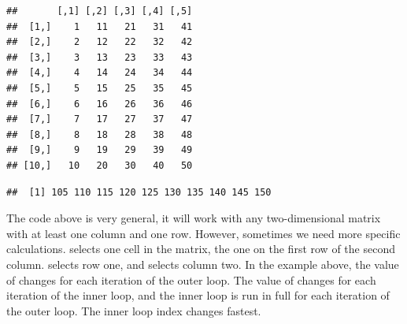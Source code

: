 \documentclass[krantz2]{krantz}\usepackage{knitr}
\begin{document}
\begin{knitrout}\footnotesize
{}\color{fgcolor}\begin{kframe}
\begin{alltt}
 \hlkwb{<-} \hlstd{(}\hlopt{:}\hlstd{,} \hlstd{)}
\end{alltt}
\begin{verbatim}
##       [,1] [,2] [,3] [,4] [,5]
##  [1,]    1   11   21   31   41
##  [2,]    2   12   22   32   42
##  [3,]    3   13   23   33   43
##  [4,]    4   14   24   34   44
##  [5,]    5   15   25   35   45
##  [6,]    6   16   26   36   46
##  [7,]    7   17   27   37   47
##  [8,]    8   18   28   38   48
##  [9,]    9   19   29   39   49
## [10,]   10   20   30   40   50
\end{verbatim}
\end{kframe}
\end{knitrout}

\begin{knitrout}\footnotesize
{}\color{fgcolor}\begin{kframe}
\begin{alltt}
 \hlkwb{<-} \hlstd{()}
   \hlopt{:}
   \hlkwb{<-} 
     \hlopt{:}
     \hlkwb{<-}  \hlopt{+} 
\hlstd{\}}
\end{alltt}
\begin{verbatim}
##  [1] 105 110 115 120 125 130 135 140 145 150
\end{verbatim}
\end{kframe}
\end{knitrout}

The code above is very general, it will work with any two-dimensional matrix with at least one column and one row. However, sometimes we need more specific calculations.  selects one cell in the matrix, the one on the first row of the second column.  selects row one, and   selects column two. In the example above, the value of  changes for each iteration of the outer loop. The value of  changes for each iteration of the inner loop, and the inner loop is run in full for each iteration of the outer loop. The inner loop index  changes fastest.
\end{document}

